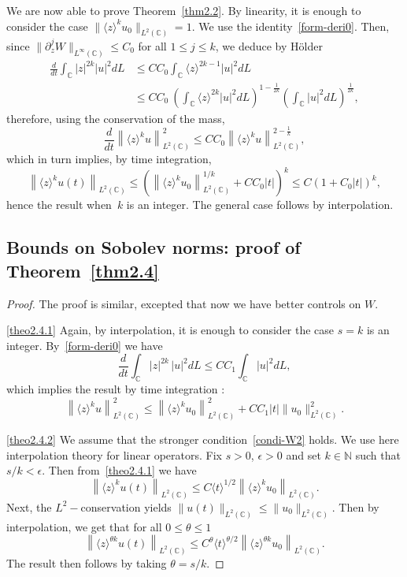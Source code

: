 \documentclass[10pt]{amsart}
\theoremstyle{definition}\newtheorem{defi}[theo]{Definition}\newtheorem{rema}[theo]{Remark}\newtheorem{exam}[theo]{Example}\newtheorem{exem}[theo]{Example}\newtheorem{nota}[theo]{Notation}
\newcommand{\C}{\mathbb{C}}
\newcommand{\N}{\mathbb{N}}
\newcommand*\eps{\epsilon}
\newcommand{\<}{\langle}
\renewcommand{\>}{\rangle}
\begin{document}
We are now able to prove Theorem~\ref{thm2.2}. By linearity, it is enough to consider the case ${\|\<z\>^ku_0\|_{L^2(\C)}=1}$. We use the identity~\eqref{form-deri0}. Then, since $ \|\partial^j_z W\|_{L^{\infty}(\C)}\leq C_0$ for all $1\leq j \leq k$, we deduce by H\"older
\begin{align*}
\frac{d}{dt}\int_{\C}|z|^{2k}|u|^2dL&\leq C C_0\int_{\C} \<z\>^{2k-1} |u|^2dL \\
&\leq CC_0\ \left(\int_{\C} \<z\>^{2k} |u|^2dL\right)^{1-\frac{1}{2k}} \left(\int_{\C} |u|^2dL\right)^{\frac{1}{2k}},
\end{align*}
therefore, using the conservation of the mass,
\[
\frac{d}{dt} \left\| \<z\>^ku\right\|^2_{L^2(\C)} \leq CC_0 \left\| \<z\>^ku\right\|^{2-\frac1{k}}_{L^2(\C)},
\]
which in turn implies, by time integration,
\[
\left\|\<z\>^ku(t)\right\|_{L^2(\C)}\leq \left(\left\|\<z\>^ku_0\right\|^{1/k}_{L^2(\C)}+ CC_0 |t|\right)^k \leq C\left(1 + C_0 |t|\right)^k,
\]
hence the result when~$k$ is an integer. The general case follows by interpolation.


\subsection{Bounds on Sobolev norms: proof of Theorem~\ref{thm2.4}}
\begin{proof}
The proof is similar, excepted that now we have better controls on $W$.

\eqref{theo2.4.1} Again, by interpolation, it is enough to consider the case $s=k$ is an integer. By~\eqref{form-deri0} we have
\[
\frac{d}{dt}\int_{\C}|z|^{2k}\,|u|^2dL\leq C C_1\int_{\C} |u|^2dL,
\]
which implies the result by time integration :
\[
\left\| \<z\>^ku\right\|^2_{L^2(\C)} \leq \left\| \<z\>^ku_0\right\|^2_{L^2(\C)} + CC_1|t| \| u_0\|^2_{L^2(\C)}.
\]

\eqref{theo2.4.2} We assume that the stronger condition~\eqref{condi-W2} holds. We use here interpolation theory for linear operators. Fix $s>0$, $\eps >0$ and set $k \in \N$ such that $s/k<\eps$. Then from~\eqref{theo2.4.1} we have
\[
\left\|\<z\>^ku(t)\right\|_{L^2(\C)} \leq C \<t\>^{1/2} \left\|\<z\>^ku_0\right\|_{L^2(\C)}.
\]
Next, the $L^2-$conservation yields $\|u(t)\|_{L^2(\C)} \leq \|u_0\|_{L^2(\C)} $. Then by interpolation, we get that for all $0 \leq \theta \leq 1$
\[
\left\|\<z\>^{\theta k}u(t)\right\|_{L^2(\C)} \leq C^{\theta} \<t\>^{\theta/2}
\left\|\<z\>^{\theta k}u_0\right\|_{L^2(\C)}.
\]
The result then follows by taking $\theta=s/k$.
\end{proof}
\end{document}

